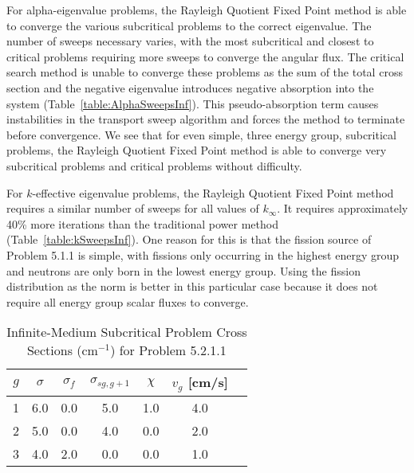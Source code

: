 For alpha-eigenvalue problems, the Rayleigh Quotient Fixed Point method is able to converge the various subcritical problems to the correct eigenvalue. The number of sweeps necessary varies, with the most subcritical and closest to critical problems requiring more sweeps to converge the angular flux. The critical search method is unable to converge these problems as the sum of the total cross section and the negative eigenvalue introduces negative absorption into the system (Table~\ref{table:AlphaSweepsInf}). This pseudo-absorption term causes instabilities in the transport sweep algorithm and forces the method to terminate before convergence. We see that for even simple, three energy group, subcritical problems, the Rayleigh Quotient Fixed Point method is able to converge very subcritical problems and critical problems without difficulty.

For $k$-effective eigenvalue problems, the Rayleigh Quotient Fixed Point method requires a similar number of sweeps for all values of $k_{\infty}$. It requires approximately 40\% more iterations than the traditional power method (Table~\ref{table:kSweepsInf}). One reason for this is that the fission source of Problem 5.1.1 is simple, with fissions only occurring in the highest energy group and neutrons are only born in the lowest energy group. Using the fission distribution as the norm is better in this particular case because it does not require all energy group scalar fluxes to converge.

\begin{table}[!htbp]
    \centering
    \caption{Infinite-Medium Subcritical Problem Cross Sections (cm$^{-1}$) for Problem 5.2.1.1}
\label{table:Betzler3}
    \begin{tabular}{*7c}
        \toprule
	$g$ & $\sigma$ & $\sigma_{f}$ & $\sigma_{sg,g+1}$ & $\chi$ & $v_{g}$ [cm/s] \\ 
        \midrule
	1 & 6.0 & 0.0 & 5.0 & 1.0 & 4.0 \\
	2 & 5.0 & 0.0 & 4.0 & 0.0 & 2.0 \\
	3 & 4.0 & 2.0 & 0.0 & 0.0 & 1.0 \\
        \bottomrule
    \end{tabular}
\end{table}

